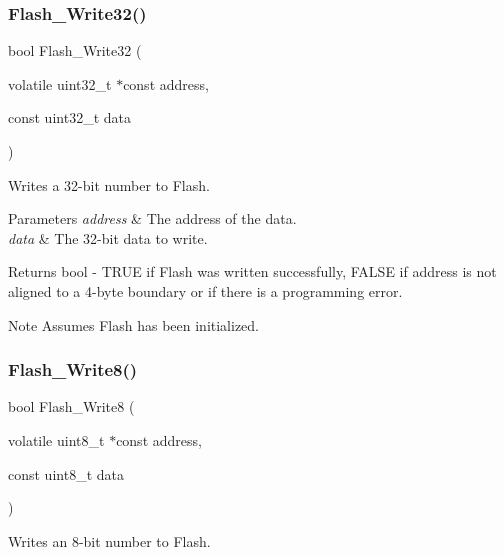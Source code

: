 \subsubsection{\texorpdfstring{Flash\+\_\+\+Write32()}{Flash\_Write32()}}
{\footnotesize\ttfamily bool Flash\+\_\+\+Write32 (\begin{DoxyParamCaption}\item[{volatile uint32\+\_\+t $\ast$const}]{address,  }\item[{const uint32\+\_\+t}]{data }\end{DoxyParamCaption})}



Writes a 32-\/bit number to Flash. 


\begin{DoxyParams}{Parameters}
{\em address} & The address of the data. \\
\hline
{\em data} & The 32-\/bit data to write. \\
\hline
\end{DoxyParams}
\begin{DoxyReturn}{Returns}
bool -\/ T\+R\+UE if Flash was written successfully, F\+A\+L\+SE if address is not aligned to a 4-\/byte boundary or if there is a programming error. 
\end{DoxyReturn}
\begin{DoxyNote}{Note}
Assumes Flash has been initialized. 
\end{DoxyNote}
\mbox{\label{group__main__module_ga1e6f34b272d8ed7b0f897b43e65f2cc0}} 
\subsubsection{\texorpdfstring{Flash\+\_\+\+Write8()}{Flash\_Write8()}}
{\footnotesize\ttfamily bool Flash\+\_\+\+Write8 (\begin{DoxyParamCaption}\item[{volatile uint8\+\_\+t $\ast$const}]{address,  }\item[{const uint8\+\_\+t}]{data }\end{DoxyParamCaption})}



Writes an 8-\/bit number to Flash. 



